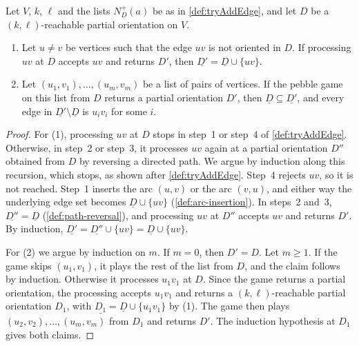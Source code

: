 \begin{lemma}
  \label{lem:runPebbleGameWith-underline-subset}
  \leanok
  Let $V$, $k$, $\ell$ and the lists $N^+_D(a)$ be as in
  \cref{def:tryAddEdge}, and let $D$ be a $(k, \ell)$-reachable partial
  orientation on $V$.
  \begin{enumerate}
    \item Let $u \ne v$ be vertices such that the edge $uv$ is not
      oriented in $D$. If processing $uv$ at $D$ accepts $uv$ and
      returns $D'$, then $\underline{D'} = \underline{D} \cup \{uv\}$.
    \item Let $(u_1, v_1), \ldots, (u_m, v_m)$ be a list of pairs of
      vertices. If the pebble game on this list from $D$ returns a
      partial orientation $D'$, then
      $\underline{D} \subseteq \underline{D'}$, and every edge in
      $\underline{D'} \setminus \underline{D}$ is $u_i v_i$ for some
      $i$.
  \end{enumerate}
\end{lemma}
\begin{proof}
  \leanok
  For (1), processing $uv$ at $D$ stops in step~1 or step~4 of
  \cref{def:tryAddEdge}. Otherwise, in step~2 or step~3, it processes
  $uv$ again at a partial orientation $D''$ obtained from $D$ by
  reversing a directed path. We argue by induction along this
  recursion, which stops, as shown after \cref{def:tryAddEdge}. Step~4
  rejects $uv$, so it is not reached. Step~1 inserts the arc $(u, v)$
  or the arc $(v, u)$, and either way the underlying edge set becomes
  $\underline{D} \cup \{uv\}$ (\cref{def:arc-insertion}). In steps~2
  and~3, $\underline{D''} = \underline{D}$ (\cref{def:path-reversal}),
  and processing $uv$ at $D''$ accepts $uv$ and returns $D'$. By
  induction, $\underline{D'} = \underline{D''} \cup \{uv\} =
  \underline{D} \cup \{uv\}$.

  For (2) we argue by induction on $m$. If $m = 0$, then $D' = D$. Let
  $m \ge 1$. If the game skips $(u_1, v_1)$, it plays the rest of the
  list from $D$, and the claim follows by induction. Otherwise it
  processes $u_1 v_1$ at $D$. Since the game returns a partial
  orientation, the processing accepts $u_1 v_1$ and returns a
  $(k, \ell)$-reachable partial orientation $D_1$, with
  $\underline{D_1} = \underline{D} \cup \{u_1 v_1\}$ by (1). The game
  then plays $(u_2, v_2), \ldots, (u_m, v_m)$ from $D_1$ and returns
  $D'$. The induction hypothesis at $D_1$ gives both claims.
\end{proof}

